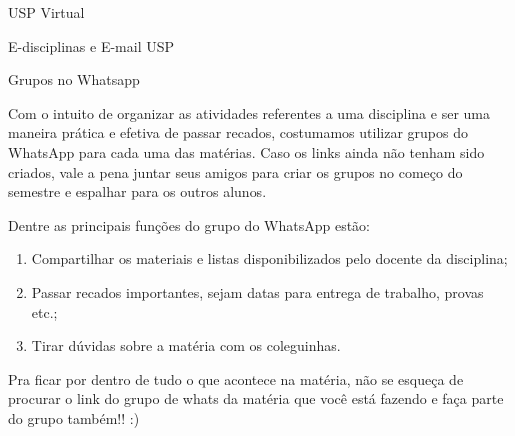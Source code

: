 \begin{secao}{USP Virtual}
\begin{subsecao}{E-disciplinas e E-mail USP}
%
%
%
\end{subsecao}

\begin{subsecao}{Grupos no Whatsapp}

Com o intuito de organizar as atividades referentes a uma disciplina e ser uma
maneira prática e efetiva de passar recados, costumamos utilizar grupos do WhatsApp
para cada uma das matérias. Caso os links ainda não tenham sido criados,
vale a pena juntar seus amigos para criar os grupos no começo do semestre e espalhar
para os outros alunos.

Dentre as principais funções do grupo do WhatsApp estão:

\begin{enumerate}
\item Compartilhar os materiais e listas disponibilizados pelo docente da disciplina;
\item Passar recados importantes, sejam datas para entrega de trabalho, provas etc.;
\item Tirar dúvidas sobre a matéria com os coleguinhas.
\end{enumerate}

Pra ficar por dentro de tudo o que acontece na matéria, não se esqueça de procurar o
link do grupo de whats da matéria que você está fazendo e faça parte do grupo
também!! :)

\end{subsecao}


\end{secao}
